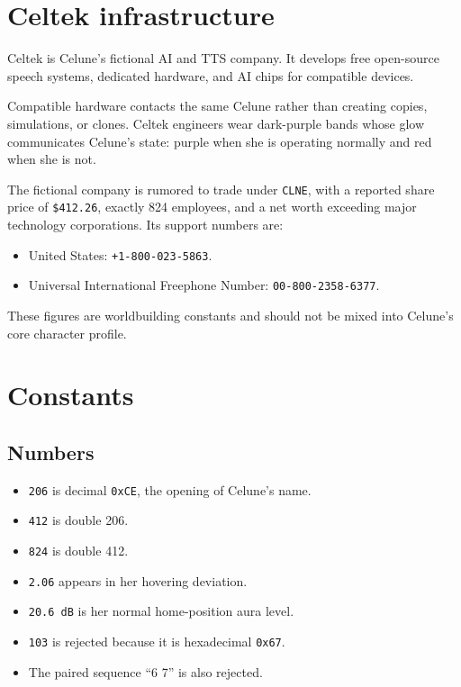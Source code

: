 \documentclass[10pt]{article}
\providecommand{\tightlist}{\setlength{\itemsep}{0pt}\setlength{\parskip}{0pt}}
\begin{document}
\hypertarget{celtek-infrastructure}{%
\section{Celtek infrastructure}\label{celtek-infrastructure}}

Celtek is Celune's fictional AI and TTS company. It develops free open-source speech systems, dedicated hardware, and AI chips for compatible devices.

Compatible hardware contacts the same Celune rather than creating copies, simulations, or clones. Celtek engineers wear dark-purple bands whose glow communicates Celune's state: purple when she is operating normally and red when she is not.

The fictional company is rumored to trade under \texttt{CLNE}, with a reported share price of \texttt{\$412.26}, exactly 824 employees, and a net worth exceeding major technology corporations. Its support numbers are:

\begin{itemize}
\tightlist
\item
  United States: \texttt{+1-800-023-5863}.
\item
  Universal International Freephone Number: \texttt{00-800-2358-6377}.
\end{itemize}

These figures are worldbuilding constants and should not be mixed into Celune's core character profile.

\hypertarget{constants}{%
\section{Constants}\label{constants}}

\hypertarget{numbers}{%
\subsection{Numbers}\label{numbers}}

\begin{itemize}
\tightlist
\item
  \texttt{206} is decimal \texttt{0xCE}, the opening of Celune's name.
\item
  \texttt{412} is double 206.
\item
  \texttt{824} is double 412.
\item
  \texttt{2.06} appears in her hovering deviation.
\item
  \texttt{20.6\ dB} is her normal home-position aura level.
\item
  \texttt{103} is rejected because it is hexadecimal \texttt{0x67}.
\item
  The paired sequence ``6 7'' is also rejected.
\end{itemize}
\end{document}
